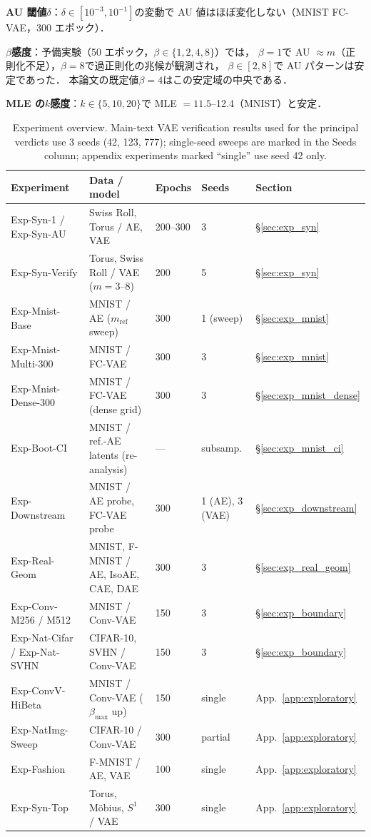 \documentclass[11pt,a4paper]{jsarticle}
\begin{document}
\textbf{AU 閾値$\delta$}：$\delta \in [10^{-3}, 10^{-1}]$の変動で
AU 値はほぼ変化しない（MNIST FC-VAE，300 エポック）．

\textbf{$\beta$感度}：予備実験（50 エポック，$\beta \in \{1, 2, 4, 8\}$）では，
$\beta = 1$で AU $\approx m$（正則化不足），$\beta = 8$で過正則化の兆候が観測され，
$\beta \in [2, 8]$で AU パターンは安定であった．
本論文の既定値$\beta = 4$はこの安定域の中央である．

\textbf{MLE の$k$感度}：$k \in \{5, 10, 20\}$で MLE $= 11.5$--12.4（MNIST）と安定．

\begin{table}[H]
\centering
\caption{Experiment overview. Main-text VAE verification results used for
the principal verdicts use 3 seeds (42, 123, 777); single-seed sweeps are
marked in the Seeds column; appendix experiments marked ``single'' use
seed 42 only.}
\label{tab:exp_list}
\small
\begin{tabular}{p{3.4cm}p{3.4cm}p{2.2cm}p{1.6cm}p{2.2cm}}
\toprule
Experiment & Data / model & Epochs & Seeds & Section \\
\midrule
Exp-Syn-1 / Exp-Syn-AU & Swiss Roll, Torus / AE, VAE & 200--300 & 3 & §\ref{sec:exp_syn} \\
Exp-Syn-Verify & Torus, Swiss Roll / VAE ($m = 3$--$8$) & 200 & 5 & §\ref{sec:exp_syn} \\
Exp-Mnist-Base & MNIST / AE ($m_{\mathrm{ref}}$ sweep) & 300 & 1 (sweep) & §\ref{sec:exp_mnist} \\
Exp-Mnist-Multi-300 & MNIST / FC-VAE & 300 & 3 & §\ref{sec:exp_mnist} \\
Exp-Mnist-Dense-300 & MNIST / FC-VAE (dense grid) & 300 & 3 & §\ref{sec:exp_mnist_dense} \\
Exp-Boot-CI & MNIST / ref.-AE latents (re-analysis) & --- & subsamp. & §\ref{sec:exp_mnist_ci} \\
Exp-Downstream & MNIST / AE probe, FC-VAE probe & 300 & 1 (AE), 3 (VAE) & §\ref{sec:exp_downstream} \\
Exp-Real-Geom & MNIST, F-MNIST / AE, IsoAE, CAE, DAE & 300 & 3 & §\ref{sec:exp_real_geom} \\
Exp-Conv-M256 / M512 & MNIST / Conv-VAE & 150 & 3 & §\ref{sec:exp_boundary} \\
Exp-Nat-Cifar / Exp-Nat-SVHN & CIFAR-10, SVHN / Conv-VAE & 150 & 3 & §\ref{sec:exp_boundary} \\
Exp-ConvV-HiBeta & MNIST / Conv-VAE ($\beta_{\max}$ up) & 150 & single & App.~\ref{app:exploratory} \\
Exp-NatImg-Sweep & CIFAR-10 / Conv-VAE & 300 & partial & App.~\ref{app:exploratory} \\
Exp-Fashion & F-MNIST / AE, VAE & 100 & single & App.~\ref{app:exploratory} \\
Exp-Syn-Top & Torus, M\"obius, $S^1$ / VAE & 300 & single & App.~\ref{app:exploratory} \\
\bottomrule
\end{tabular}
\end{table}
\end{document}
